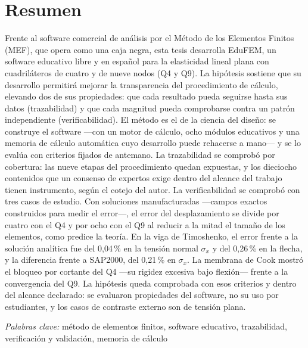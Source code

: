 \chapter*{Resumen}

\noindent Frente al software comercial de análisis por el Método de los Elementos Finitos (MEF), que opera como una caja negra, esta tesis desarrolla EduFEM, un software educativo libre y en español para la elasticidad lineal plana con cuadriláteros de cuatro y de nueve nodos (Q4 y Q9). La hipótesis sostiene que su desarrollo permitirá mejorar la transparencia del procedimiento de cálculo, elevando dos de sus propiedades: que cada resultado pueda seguirse hasta sus datos (trazabilidad) y que cada magnitud pueda comprobarse contra un patrón independiente (verificabilidad). El método es el de la ciencia del diseño: se construye el software ---con un motor de cálculo, ocho módulos educativos y una memoria de cálculo automática cuyo desarrollo puede rehacerse a mano--- y se lo evalúa con criterios fijados de antemano. La trazabilidad se comprobó por cobertura: las nueve etapas del procedimiento quedan expuestas, y los dieciocho contenidos que un consenso de expertos exige dentro del alcance del trabajo tienen instrumento, según el cotejo del autor. La verificabilidad se comprobó con tres casos de estudio. Con soluciones manufacturadas ---campos exactos construidos para medir el error---, el error del desplazamiento se divide por cuatro con el Q4 y por ocho con el Q9 al reducir a la mitad el tamaño de los elementos, como predice la teoría. En la viga de Timoshenko, el error frente a la solución analítica fue del 0,04\,\% en la tensión normal $\sigma_x$ y del 0,26\,\% en la flecha, y la diferencia frente a SAP2000, del 0,21\,\% en $\sigma_x$. La membrana de Cook mostró el bloqueo por cortante del Q4 ---su rigidez excesiva bajo flexión--- frente a la convergencia del Q9. La hipótesis queda comprobada con esos criterios y dentro del alcance declarado: se evaluaron propiedades del software, no su uso por estudiantes, y los casos de contraste externo son de tensión plana.

\textit{Palabras clave:} método de elementos finitos, software educativo, trazabilidad, verificación y validación, memoria de cálculo
